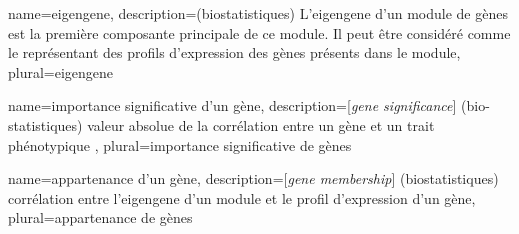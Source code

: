{
	name={eigengene},
	description={(biostatistiques) L'eigengene d'un module de gènes est la première composante principale de ce module. Il peut être considéré comme le représentant des profils d'expression des gènes présents dans le module}, 
	plural={eigengene}
}

{
	name={importance significative d'un g\`ene},
	description={[\textit{gene significance}] (bio-statistiques) valeur absolue de la corrélation entre un gène et un trait phénotypique }, 
	plural={importance significative de g\`enes}
}

{
	name={appartenance d'un g\`ene},
	description={[\textit{gene membership}] (biostatistiques) corrélation entre l'eigengene d'un module et le profil d'expression d'un gène}, 
	plural={appartenance de g\`enes}
}





